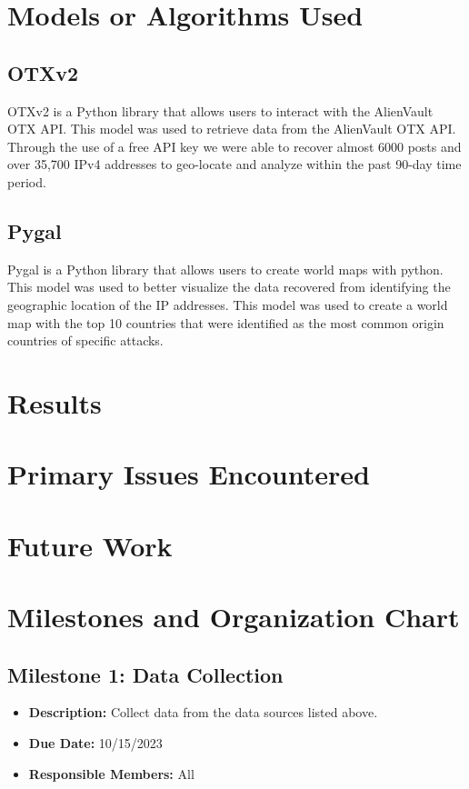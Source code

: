 \documentclass[letterpaper, 10 pt, conference]{ieeeconf}  %
\begin{document}
\section{Models or Algorithms Used}
    \subsection*{OTXv2}
    OTXv2 is a Python library that allows users to interact with the AlienVault OTX API. This model was used to retrieve data from the AlienVault OTX API. Through the use of a free API key we
    were able to recover almost 6000 posts and over 35,700 IPv4 addresses to geo-locate and analyze within the past 90-day time period.

    \subsection*{Pygal}
    Pygal is a Python library that allows users to create world maps with python. This model was used to better visualize the data recovered from identifying the
    geographic location of the IP addresses. This model was used to create a world map with the top 10 countries that were identified as the most common origin countries of specific attacks.


\section{Results}

\section{Primary Issues Encountered}

\section{Future Work}

\section{Milestones and Organization Chart}

    \subsection*{Milestone 1: Data Collection}
    \begin{itemize}
        \item \textbf{Description:} Collect data from the data sources listed above.
        \item \textbf{Due Date:} 10/15/2023
        \item \textbf{Responsible Members:} All
    \end{itemize}
\end{document}
